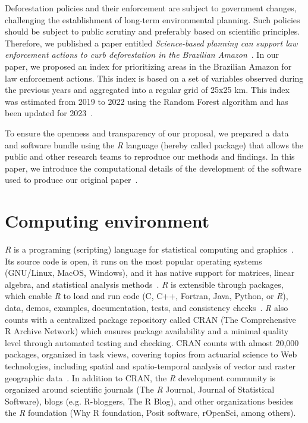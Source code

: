\documentclass[12pt]{article}
\begin{document}
Deforestation policies and their enforcement are subject to government changes, challenging the establishment of long-term environmental planning. 
Such policies should be subject to public scrutiny and preferably based on scientific principles. 
Therefore, we published a paper entitled \textit{Science-based planning can support law enforcement actions to curb deforestation in the Brazilian Amazon}~\cite{mataveli2022}.
In our paper, we proposed an index for prioritizing areas in the Brazilian Amazon for law enforcement actions. 
This index is based on a set of variables observed during the previous years and aggregated into a regular grid of 25x25 km.
This index was estimated from 2019 to 2022 using the Random Forest algorithm and has been updated for 2023~\cite{mataveli2023}.

To ensure the openness and transparency of our proposal, we prepared a data and software bundle using the \textit{R} language (hereby called package) that allows the public and other research teams to reproduce our methods and findings.
In this paper, we introduce the computational details of the development of the software used to produce our original paper~\cite{mataveli2022}.


\section{Computing environment}

\textit{R} is a programing (scripting) language for statistical computing and graphics~\cite{rlanguage}.
Its source code is open, it runs on the most popular operating systems (GNU/Linux, MacOS, Windows), and it has native support for matrices, linear algebra, and statistical analysis methods~\cite{ihaka1996a}.
\textit{R} is extensible through packages, which enable \textit{R} to load and run code (C, C++, Fortran, Java, Python, or \textit{R}), data, demos, examples, documentation, tests, and consistency checks~\cite{wickham2015}.
\textit{R} also counts with a centralized package repository called CRAN (The Comprehensive R Archive Network) which ensures package availability and a minimal quality level through automated testing and checking.
CRAN counts with almost 20,000 packages, organized in task views, covering topics from actuarial science to Web technologies, including spatial and spatio-temporal analysis of vector and raster geographic data~\cite{Pebesma2012}.
In addition to CRAN, the \textit{R} development community is organized around scientific journals (The \textit{R} Journal, Journal of Statistical Software), blogs (e.g. R-bloggers, The R Blog), and other organizations besides the \textit{R} foundation (Why R foundation, Posit software, rOpenSci, among others).
\end{document}
